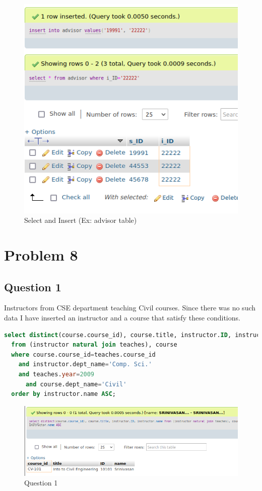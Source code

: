 \documentclass{article}
\begin{document}
\begin{figure}[!ht]
  \begin{center}
  \includegraphics[scale=0.7]{Q7_3.png}
  \caption{Select and Insert (Ex: advisor table)}
  \end{center}
\end{figure}


\newpage

\section{Problem 8}
\subsection{Question 1}
Instructors from CSE department teaching Civil courses. Since there was no such data I have inserted
an instructor and a course that satisfy these conditions.
\begin{lstlisting}[language=sql]
  select distinct(course.course_id), course.title, instructor.ID, instructor.name
  from (instructor natural join teaches), course
  where course.course_id=teaches.course_id 
    and instructor.dept_name='Comp. Sci.'
    and teaches.year=2009 
      and course.dept_name='Civil'
  order by instructor.name ASC;
\end{lstlisting}
\begin{figure}[!ht]
  \begin{center}
  \includegraphics[scale=1]{Q8_1.png}
  \caption{Question 1}
  \end{center}
\end{figure}
\end{document}
